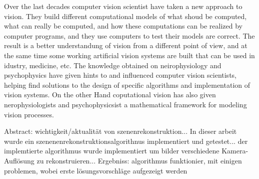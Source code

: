  
 Over the last decades computer vision scientist have taken a new approach to vision. They build different computational models of what shoud be computed, what can really be computed, and how these computations can be realized by computer programs, and they use computers to test their models are correct. The result is a better understandung of vision from a different point of view, and at the same time some working artificial vision systems are built that can be used in idustry, medicine, etc. The knowledge obtained on neirophysiology and psychophysics have given hints to and influenced computer vision scientists, helping find solutions to the design of specific algorithms and implementation of vision systems. On the other Hand coputational vision has also given nerophysiologists and psychophysicsist a mathematical framework for modeling vision processes.\cite{ZZGXr}
 
 
 Abstract: wichtigkeit/aktualität von szenenrekonstruktion...  In dieser arbeit wurde ein szenenenrekonstruktionsalgorithnus implementiert und getestet... der implemtierte algorithmus wurde implementiert um bilder verschiedene Kamera-Auflösung zu rekonstruieren...
 Ergebniss: algorithmus funktionier, mit einigen problemen, wobei erste lösungsvorschläge aufgezeigt werden